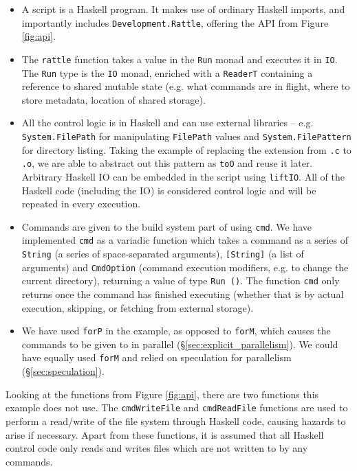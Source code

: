 \begin{itemize}
\item A \Rattle script is a Haskell program. It makes use of ordinary Haskell imports, and importantly includes \texttt{Development.Rattle}, offering the API from Figure \ref{fig:api}.
\item The \texttt{rattle} function takes a value in the \texttt{Run} monad and executes it in \texttt{IO}. The \texttt{Run} type is the \texttt{IO} monad, enriched with a \texttt{ReaderT} \cite{mtl} containing a reference to shared mutable state (e.g. what commands are in flight, where to store metadata, location of shared storage).
\item All the control logic is in Haskell and can use external libraries -- e.g. \texttt{System.FilePath} for manipulating \texttt{FilePath} values and \texttt{System.FilePattern} for directory listing. Taking the example of replacing the extension from \texttt{.c} to \texttt{.o}, we are able to abstract out this pattern as \texttt{toO} and reuse it later. Arbitrary Haskell IO can be embedded in the script using \texttt{liftIO}. All of the Haskell code (including the IO) is considered control logic and will be repeated in every execution.
\item Commands are given to the build system part of \Rattle using \texttt{cmd}. We have implemented \texttt{cmd} as a variadic function \cite{variadic_functions} which takes a command as a series of \texttt{String} (a series of space-separated arguments), \texttt{[String]} (a list of arguments) and \texttt{CmdOption} (command execution modifiers, e.g. to change the current directory), returning a value of type \texttt{Run ()}. The function \texttt{cmd} only returns once the command has finished executing (whether that is by actual execution, skipping, or fetching from external storage).
\item We have used \texttt{forP} in the example, as opposed to \texttt{forM}, which causes the commands to be given to \Rattle in parallel (\S\ref{sec:explicit_parallelism}). We could have equally used \texttt{forM} and relied on speculation for parallelism (\S\ref{sec:speculation}).
\end{itemize}

Looking at the functions from Figure \ref{fig:api}, there are two functions this example does not use. The \texttt{cmdWriteFile} and \texttt{cmdReadFile} functions are used to perform a read/write of the file system through Haskell code, causing hazards to arise if necessary. Apart from these functions, it is assumed that all Haskell control code only reads and writes files which are not written to by any commands.

